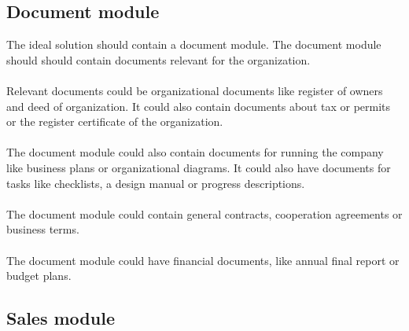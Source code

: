 \subsection{Document module}

The ideal solution should contain a document module. The document module should should contain documents relevant for the organization.\\
\\
Relevant documents could be organizational documents like register of owners and deed of organization. It could also contain documents about tax or permits or the register certificate of the organization.\\
\\
The document module could also contain documents for running the company like business plans or organizational diagrams. It could also have documents for tasks like checklists, a design manual or progress descriptions.\\
\\
The document module could contain general contracts, cooperation agreements or business terms.\\
\\
The document module could have financial documents, like annual final report or budget plans.

\subsection{Sales module}